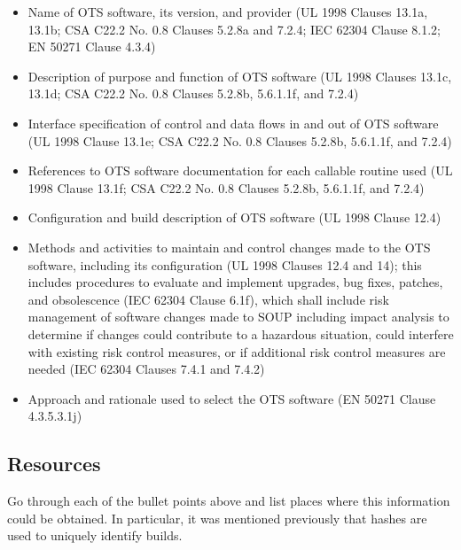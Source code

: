 \documentclass[12pt]{../Common_files/ElisaPaper}
\begin{document}
\begin{itemize}

\item Name of OTS software, its version, and provider (UL 1998 \cite{UL1998} Clauses 13.1a, 13.1b; CSA C22.2 No. 0.8 \cite{CSA0.8} Clauses 5.2.8a and 7.2.4; IEC 62304 \cite{IEC62304} Clause 8.1.2; EN 50271 \cite{EN50271} Clause 4.3.4)

\item Description of purpose and function of OTS software (UL 1998 \cite{UL1998} Clauses 13.1c, 13.1d; CSA C22.2 No. 0.8 \cite{CSA0.8} Clauses 5.2.8b, 5.6.1.1f, and 7.2.4)

\item Interface specification of control and data flows in and out of OTS software (UL 1998 \cite{UL1998} Clause 13.1e; CSA C22.2 No. 0.8 \cite{CSA0.8} Clauses 5.2.8b, 5.6.1.1f, and 7.2.4)

\item References to OTS software documentation for each callable routine used (UL 1998 \cite{UL1998} Clause 13.1f; CSA C22.2 No. 0.8 \cite{CSA0.8} Clauses 5.2.8b, 5.6.1.1f, and 7.2.4)

\item Configuration and build description of OTS software (UL 1998 \cite{UL1998} Clause 12.4)

\item Methods and activities to maintain and control changes made to the OTS software, including its configuration (UL 1998 \cite{UL1998} Clauses 12.4 and 14); this includes procedures to evaluate and implement upgrades, bug fixes, patches, and obsolescence (IEC 62304 \cite{IEC62304} Clause 6.1f), which shall include risk management of software changes made to SOUP including impact analysis to determine if changes could contribute to a hazardous situation, could interfere with existing risk control measures, or if additional risk control measures are needed (IEC 62304 \cite{IEC62304} Clauses 7.4.1 and 7.4.2)

\item Approach and rationale used to select the OTS software (EN 50271 \cite{EN50271} Clause 4.3.5.3.1j)

\end{itemize}

\subsection{Resources}
Go through each of the bullet points above and list places where this information could be obtained.  In particular, it was mentioned previously that hashes are used to uniquely identify builds.
\end{document}
